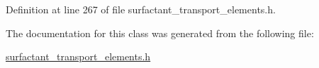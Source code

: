 Definition at line 267 of file surfactant\+\_\+transport\+\_\+elements.\+h.



The documentation for this class was generated from the following file\+:\begin{DoxyCompactItemize}
\item 
\hyperlink{surfactant__transport__elements_8h}{surfactant\+\_\+transport\+\_\+elements.\+h}\end{DoxyCompactItemize}
